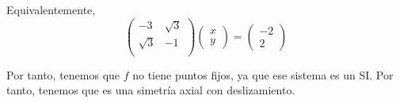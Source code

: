 \begin{ejercicio}
\begin{enumerate}
        Equivalentemente,
        \begin{equation*}
            \left(
            \begin{array}{cc}
                -3 & \sqrt{3} \\
                \sqrt{3} & -1 \\
            \end{array}
            \right)
            \left(
            \begin{array}{c}
                x\\y
            \end{array}
            \right)
            = \left(
            \begin{array}{c}
                -2\\2
            \end{array}
            \right)
        \end{equation*}

        Por tanto, tenemos que $f$ no tiene puntos fijos, ya que ese sistema es un SI. Por tanto, tenemos que es una simetría axial con deslizamiento.


\end{enumerate}
\end{ejercicio}
